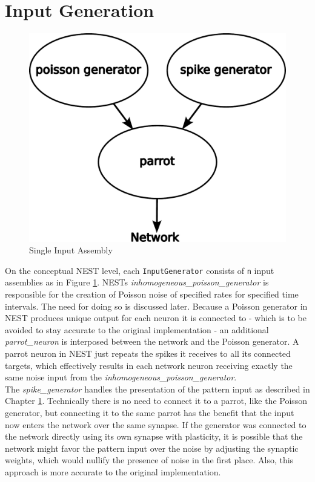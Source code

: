 \section{Input Generation} \label{sec:input_generation}
\begin{figure}
    \begin{center}
        \includegraphics[width=0.4\columnwidth]{Figures/input_generator_structure.pdf}
    \end{center}
\caption{Single Input Assembly}
\label{fig:input_generator_structure}
\end{figure}
On the conceptual NEST level, each \texttt{InputGenerator} consists of \texttt{n} input assemblies as in Figure \ref{fig:input_generator_structure}. NESTs \textit{inhomogeneous\_poisson\_generator} is responsible for the creation of Poisson noise of specified rates for specified time intervals. The need for doing so is discussed later. 
Because a Poisson generator in NEST produces unique output for each neuron it is connected to - which is to be avoided to stay accurate to the original implementation - an additional \textit{parrot\_neuron} is interposed between the network and the Poisson generator. A parrot neuron in NEST just repeats the spikes it receives to all its connected targets, which effectively results in each network neuron receiving exactly the same noise input from the \textit{inhomogeneous\_poisson\_generator}.\\
The \textit{spike\_generator} handles the presentation of the pattern input as described in Chapter \ref{sec:input_generation}. Technically there is no need to connect it to a parrot, like the Poisson generator, but connecting it to the same parrot has the benefit that the input now enters the network over the same synapse. If the generator was connected to the network directly using its own synapse with plasticity, it is possible that the network might favor the pattern input over the noise by adjusting the synaptic weights, which would nullify the presence of noise in the first place. Also, this approach is more accurate to the original implementation.
